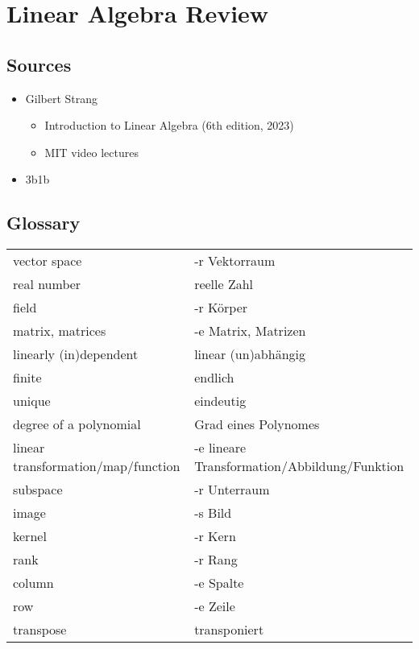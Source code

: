 \documentclass{article}
\theoremstyle{remark}
\begin{document}
    \section{Linear Algebra Review}
    \subsection{Sources}
    \begin{itemize}
        \item Gilbert Strang\begin{itemize}
                \item Introduction to Linear Algebra (6th edition, 2023)
                \item MIT video lectures
        \end{itemize}
        \item 3b1b
    \end{itemize}
    \subsection{Glossary}
    \begin{tabular}{ll}
        vector space & -r Vektorraum\\
        real number & reelle Zahl\\
        field & -r Körper\\
        matrix, matrices & -e Matrix, Matrizen\\
        linearly (in)dependent & linear (un)abhängig\\
        finite & endlich\\
        unique & eindeutig\\
        degree of a polynomial & Grad eines Polynomes\\
        linear transformation/map/function & -e lineare Transformation/Abbildung/Funktion\\
        subspace & -r Unterraum\\
        image & -s Bild\\
        kernel & -r Kern\\
        rank & -r Rang\\
        column & -e Spalte\\
        row & -e Zeile\\
        transpose & transponiert
    \end{tabular}
\end{document}
